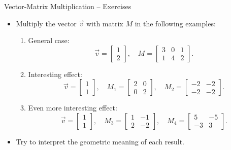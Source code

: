 \documentclass{beamer}
\begin{document}
\begin{frame}{Vector-Matrix Multiplication – Exercises}
  \begin{itemize}
    \item Multiply the vector $\vec{v}$ with matrix $M$ in the following examples:
    \begin{enumerate}
      \item General case:
      \begin{equation}
      \vec{v} = \begin{bmatrix} 1 \\ 2 \end{bmatrix},\quad
      M = \begin{bmatrix} 3 & 0 & 1 \\ 1 & 4 & 2 \end{bmatrix}.
      \end{equation}
      \item Interesting effect:
      \begin{equation}
      \vec{v} = \begin{bmatrix} 1 \\ 1 \end{bmatrix},\quad
      M_1 = \begin{bmatrix} 2 & 0 \\ 0 & 2 \end{bmatrix}, \quad
      M_2 = \begin{bmatrix} -2 & -2 \\ -2 & -2 \end{bmatrix}.
      \end{equation}
      \item Even more interesting effect:
      \begin{equation}
      \vec{v} = \begin{bmatrix} 1 \\ 1 \end{bmatrix},\quad
      M_3 = \begin{bmatrix} 1 & -1 \\ 2 & -2 \end{bmatrix}, \quad
      M_4 = \begin{bmatrix} 5 & -5 \\ -3 & 3 \end{bmatrix}.
      \end{equation}
    \end{enumerate}
    \item Try to interpret the geometric meaning of each result.
  \end{itemize}
\end{frame}
\end{document}
